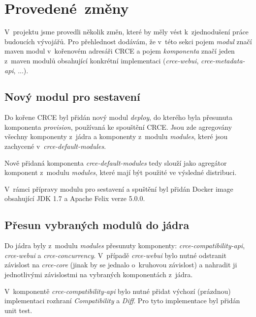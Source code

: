 \documentclass[12pt, a4paper]{article}
\begin{document}
\section{Provedené~změny} %

V~projektu jsme provedli několik změn, které by měly vést k~zjednodušení práce budoucích vývojářů. Pro přehlednost dodávám, že v~této sekci pojem \textit{modul} značí maven modul v~kořenovém adresáři CRCE a pojem \textit{komponenta} značí jeden z~maven modulů obsahující konkrétní implementaci (\textit{crce-webui}, \textit{crce-metadata-api}, ...).

\subsection{Nový modul pro sestavení}
Do kořene CRCE byl přidán nový modul \textit{deploy}, do kterého byla přesunuta komponenta \textit{provision}, používaná ke spouštění CRCE. Jsou zde agregovány všechny komponenty z~jádra a komponenty z~modulu \textit{modules}, které jsou zachycené v~\textit{crce-default-modules}. 

Nově přidaná komponenta \textit{crce-default-modules} tedy slouží jako agregátor komponent z~modulu \textit{modules}, které mají být použité ve výsledné distribuci.

V~rámci přípravy modulu pro sestavení a spuštění byl přidán Docker image obsahující JDK 1.7 a Apache Felix verze 5.0.0.

\subsection{Přesun vybraných modulů do jádra}
Do jádra byly z~modulu \textit{modules} přesunuty komponenty: \textit{crce-compatibility-api}, \textit{crce-webui} a \textit{crce-concurrency}. V~případě \textit{crce-webui} bylo nutné odstranit závislost na \textit{crce-core} (jinak by se jednalo o~kruhovou závislost) a nahradit ji jednotlivými závislostmi na vybraných komponentách z~jádra.

V~komponentě \textit{crce-compatibility-api} bylo nutné přidat výchozí (prázdnou) implementaci rozhraní \textit{Compatibility} a \textit{Diff}. Pro tyto implementace byl přidán unit test.
\end{document}
